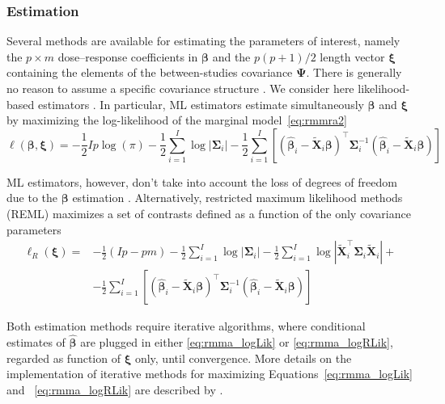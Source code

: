 \documentclass[11pt,a4paper,twoside,openany]{book}\usepackage{knitr}
\begin{document}
{\subsubsection*{Estimation}

Several methods are available for estimating the parameters of interest, namely the $p \times m$ dose--response coefficients in $\boldsymbol{\beta}$ and the $p(p+1)/2$ length vector $\boldsymbol{\xi}$ containing the elements of the between-studies covariance $\boldsymbol{\Psi}$. There is generally no reason to assume a specific covariance structure \citep{white2011multivariate}. We consider here likelihood-based estimators \citep{verbeke1997linear, pinheiro2010mixed}. In particular, ML estimators estimate simultaneously $\boldsymbol{\beta}$ and $\boldsymbol{\xi}$ by maximizing the log-likelihood of the marginal model~\ref{eq:rmmra2}
\begin{equation}
\ell\left(\boldsymbol{\beta}, \boldsymbol{\xi} \right) = -\frac{1}{2}Ip\log(\pi) -\frac{1}{2}\sum_{i=1}^I \log |\boldsymbol{\Sigma}_i| - \frac{1}{2}\sum_{i=1}^I\left[ \left(\boldsymbol{\hat \beta}_i - \widetilde{\mathbf{X}}_i\boldsymbol{\beta} \right)^\top \boldsymbol{\Sigma}_i^{-1} \left(\boldsymbol{\hat \beta}_i - \widetilde{\mathbf{X}}_i\boldsymbol{\beta} \right) \right]
\label{eq:rmma_logLik}
\end{equation}

\noindent ML estimators, however, don’t take into account the loss of degrees of freedom due to the $\boldsymbol{\beta}$ estimation \cite{harville1977maximum}. Alternatively, restricted maximum likelihood methods (REML) maximizes a set of contrasts defined as a function of the only covariance parameters
\begin{equation}
\begin{split}
\ell_R\left(\boldsymbol{\xi} \right) =& -\frac{1}{2}\left(Ip - pm\right) -\frac{1}{2}\sum_{i=1}^I \log |\boldsymbol{\Sigma}_i| -\frac{1}{2}\sum_{i=1}^I \log \left|\widetilde{\mathbf{X}}_i^\top\boldsymbol{\Sigma}_i\widetilde{\mathbf{X}}_i \right| + \\
&- \frac{1}{2}\sum_{i=1}^I\left[ \left(\boldsymbol{\hat \beta}_i - \widetilde{\mathbf{X}}_i\boldsymbol{\beta} \right)^\top \boldsymbol{\Sigma}_i^{-1} \left(\boldsymbol{\hat \beta}_i - \widetilde{\mathbf{X}}_i\boldsymbol{\beta} \right) \right]
\end{split}
\label{eq:rmma_logRLik}
\end{equation}

\noindent Both estimation methods require iterative algorithms, where conditional estimates of $\boldsymbol{\hat \beta}$ are plugged in either \ref{eq:rmma_logLik} or \ref{eq:rmma_logRLik}, regarded as function of $\boldsymbol{\xi}$ only, until convergence. More details on the implementation of iterative methods for maximizing Equations~\ref{eq:rmma_logLik} and ~\ref{eq:rmma_logRLik} are described by \cite{gasparrini2012multivariate}.


}
\end{document}
